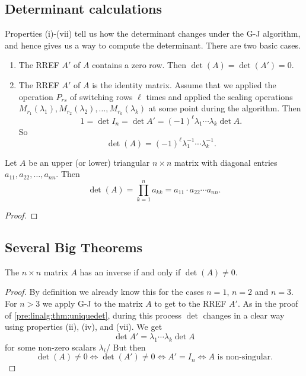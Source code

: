 \documentclass[10pt, a4paper]{article}
\begin{document}
\subsection{Determinant calculations}
Properties (i)-(vii) tell us how the determinant changes under the G-J algorithm,
and hence gives us a way to compute the determinant.
There are two basic cases.
\begin{enumerate}[label = (\Roman*)]
    \item The RREF $A'$ of $A$ contains a zero row.
    Then $\det(A) = \det(A') = 0$.
    \item The RREF $A'$ of $A$ is the identity matrix.
    Assume that we applied the operation $P_{rs}$ of switching rows $\ell$ times and applied the scaling operations $M_{r_1}(\lambda_1), M_{r_2}(\lambda_2), \dotsc, M_{r_k}(\lambda_k)$ at some point during the algorithm.
    Then
    \[
    1 = \det I_n = \det A' = (-1) ^ \ell \lambda_1 \dotsi \lambda_k\det A.
    \]
    So
    \[
    \det(A) = (-1) ^ \ell \lambda_1 ^ {-1} \dotsi \lambda_k ^ {-1}.
    \]
\end{enumerate}
\begin{proposition}
    Let $A$ be an upper (or lower) triangular $n \times n$ matrix with diagonal entries $a_{11}, a_{22}, \dotsc, a_{nn}$.
    Then
    \[
    \det(A) = \prod_{k = 1}^{n}a_{kk} = a_{11} \cdot a_{22} \dotsi a_{nn}.
    \]
    \begin{proof}
        
    \end{proof}
\end{proposition}

\subsection{Several Big Theorems}
\begin{theorem}\label{pre:linalg:thm:invifdetnonzero}
    The $n \times n$ matrix $A$ has an inverse if and only if $\det(A) \neq 0$.
    \begin{proof}
        By definition we already know this for the cases $n = 1$,
        $n = 2$ and $n = 3$.
        For $n > 3$ we apply G-J to the matrix $A$ to get to the RREF $A'$.
        As in the proof of \autoref{pre:linalg:thm:uniquedet},
        during this process $\det$ changes in a clear way using properties (ii), (iv), and (vii).
        We get
        \[
        \det A' = \lambda_1\dotsi\lambda_k\det A
        \]
        for some non-zero scalars $\lambda_i$/
        But then
        \[
        \det(A) \neq 0 \iff \det(A') \neq 0 \iff A' = I_n \iff A \text{ is non-singular}.
        \]
    \end{proof}
\end{theorem}
\end{document}
